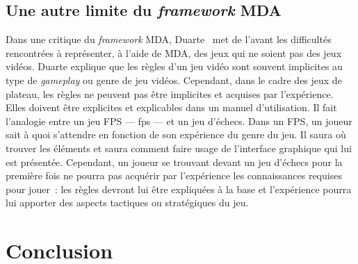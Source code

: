 \subsection{Une autre limite du \emph{framework} MDA}
Dans une critique du \emph{framework} MDA, Duarte~\cite{GAMA_MDA} met de l'avant les difficultés  rencontr\'ees à représenter, \`a l'aide de MDA, des jeux qui ne soient pas des jeux vidéos. 
Duarte explique que les règles d'un jeu vidéo sont souvent implicites au type de \emph{gameplay} ou genre de jeu vidéos. 
Cependant, dans le cadre des jeux de plateau, les règles ne peuvent pas être implicites et acquises par l'expérience. 
Elles doivent être explicites et explicables dans un manuel d'utilisation. 
Il fait l'analogie entre un jeu FPS --- \gls{fps} --- et un jeu d'échecs. Dans un FPS, un joueur sait à quoi s'attendre en fonction de son expérience du genre du jeu. 
Il saura o\`u trouver les éléments et saura comment faire usage de l'interface graphique qui lui est présentée. 
Cependant, un joueur se trouvant devant un jeu d'échecs pour la première fois ne pourra pas acquérir par l'exp\'erience les connaissances requises pour jouer~: les règles devront lui être expliquées à la base et l'expérience pourra lui apporter des aspects tactiques ou strat\'egiques du jeu.

\section{Conclusion}

